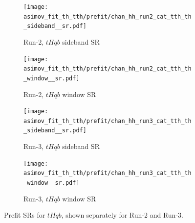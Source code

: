 \begin{figure}[htbp]
  \centering
  \begin{subfigure}[t]{0.45\textwidth}
    \centering
    \texttt{[image: asimov\_fit\_th\_tth/prefit/chan\_hh\_run2\_cat\_tth\_th\_sideband\_\_sr.pdf]}
    \caption{Run-2, $tHqb$ sideband SR}
  \end{subfigure}
  \hfill
  \begin{subfigure}[t]{0.45\textwidth}
    \centering
    \texttt{[image: asimov\_fit\_th\_tth/prefit/chan\_hh\_run2\_cat\_tth\_th\_window\_\_sr.pdf]}
    \caption{Run-2, $tHqb$ window SR}
  \end{subfigure}

  \vspace{0.4cm}
  \begin{subfigure}[t]{0.45\textwidth}
    \centering
    \texttt{[image: asimov\_fit\_th\_tth/prefit/chan\_hh\_run3\_cat\_tth\_th\_sideband\_\_sr.pdf]}
    \caption{Run-3, $tHqb$ sideband SR}
  \end{subfigure}
  \hfill
  \begin{subfigure}[t]{0.45\textwidth}
    \centering
    \texttt{[image: asimov\_fit\_th\_tth/prefit/chan\_hh\_run3\_cat\_tth\_th\_window\_\_sr.pdf]}
    \caption{Run-3, $tHqb$ window SR}
  \end{subfigure}

  \caption{Prefit SRs for $tHqb$, shown separately for Run-2 and Run-3.}
  \label{fig:srs_th}
\end{figure}

